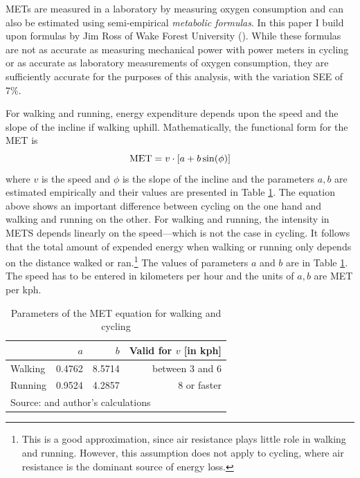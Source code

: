 \documentclass{article}[12pt,letterpaper]
\begin{document}
METs are measured in a laboratory by measuring oxygen consumption and can also be estimated using semi-empirical {\em metabolic formulas}.
In this paper I build upon formulas by Jim Ross of Wake Forest University (\cite{wake-forrest-mets}).
While these formulas are not as accurate as measuring mechanical power with power meters in cycling or as accurate as laboratory measurements of oxygen consumption, they are sufficiently accurate for the purposes of this analysis, with the 
variation SEE of 7\%.

For walking and running, energy expenditure depends upon the speed and the slope of the incline if walking uphill. Mathematically, the functional form for the MET is
\begin{equation}
  {\rm MET} = v \cdot \left[a + b \sin(\phi) \right] 
\end{equation}
where $v$ is the speed and $\phi$ is the slope of the incline and the parameters $a,b$ are estimated empirically and their values are presented in Table \ref{tab:met-parameter_estimates}.
The equation above shows an important difference between cycling on the one hand and walking and running on the other. For walking and running, the intensity in METS depends linearly on the speed---which is not the case in cycling. It follows that the total amount of expended energy when walking or running only depends on the distance walked or ran.\footnote{This is a good approximation, since air resistance plays little role in walking and running. However, this assumption does not apply to cycling, where air resistance is the dominant source of energy loss.}
The values of parameters $a$ and $b$ are in Table \ref{tab:met-parameter_estimates}. The speed has to be entered in kilometers per hour and the units of $a,b$ are MET per kph.
\begin{table}
  \begin{center}
    \caption{Parameters of the MET equation for walking and cycling}
    \label{tab:met-parameter_estimates}
    \begin{tabular}{l|r|r|r}
      \hline
      & $a$ & $b$ & Valid for $v$ [in kph] \\
      \hline
      Walking & 0.4762 & 8.5714 & between 3 and 6 \\
      Running &  0.9524 & 4.2857  & 8 or faster  \\
      \hline
      \multicolumn{4}{l}{Source: \cite{wake-forrest-mets} and author's calculations}
    \end{tabular}
  \end{center}
\end{table}
\end{document}
